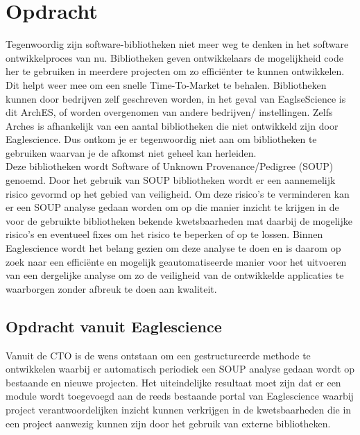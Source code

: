 
\chapter{Opdracht} %

\label{ch:opdracht} %
Tegenwoordig zijn software-bibliotheken niet meer weg te denken in het software ontwikkelproces van nu. Bibliotheken geven ontwikkelaars de mogelijkheid code her te gebruiken in meerdere  projecten om zo effici\"enter te kunnen ontwikkelen. Dit helpt weer mee om een snelle Time-To-Market te behalen. Bibliotheken kunnen door bedrijven zelf geschreven worden, in het geval van EaglseScience is dit ArchES, of worden overgenomen van andere bedrijven/ instellingen. Zelfs Arches is afhankelijk van een aantal bibliotheken die niet ontwikkeld zijn door Eaglescience. Dus ontkom je er tegenwoordig niet aan om bibliotheken te gebruiken waarvan je de afkomst niet geheel kan herleiden. 
\\
Deze bibliotheken wordt Software of Unknown Provenance/Pedigree (SOUP) genoemd. Door het gebruik van SOUP bibliotheken wordt er een aannemelijk risico gevormd op het gebied van veiligheid. Om deze risico’s te verminderen kan er een SOUP analyse gedaan worden om op die manier inzicht te krijgen in de voor de gebruikte bibliotheken bekende kwetsbaarheden mat daarbij de mogelijke risico’s en eventueel fixes om het risico te beperken of op te lossen.
Binnen Eaglescience wordt het belang gezien om deze analyse te doen en is daarom op zoek naar een efficiënte en mogelijk geautomatiseerde manier voor het uitvoeren van een dergelijke analyse om zo de veiligheid van de ontwikkelde applicaties te waarborgen zonder afbreuk te doen aan kwaliteit. 


\section{Opdracht vanuit Eaglescience}
Vanuit de CTO is de wens ontstaan om een gestructureerde methode te ontwikkelen waarbij er automatisch periodiek een SOUP analyse gedaan wordt op bestaande en nieuwe projecten. Het uiteindelijke resultaat moet zijn dat er een module wordt toegevoegd aan de reeds bestaande portal van Eaglescience waarbij project verantwoordelijken inzicht kunnen verkrijgen in de kwetsbaarheden die in een project aanwezig kunnen zijn door het gebruik van externe bibliotheken.

